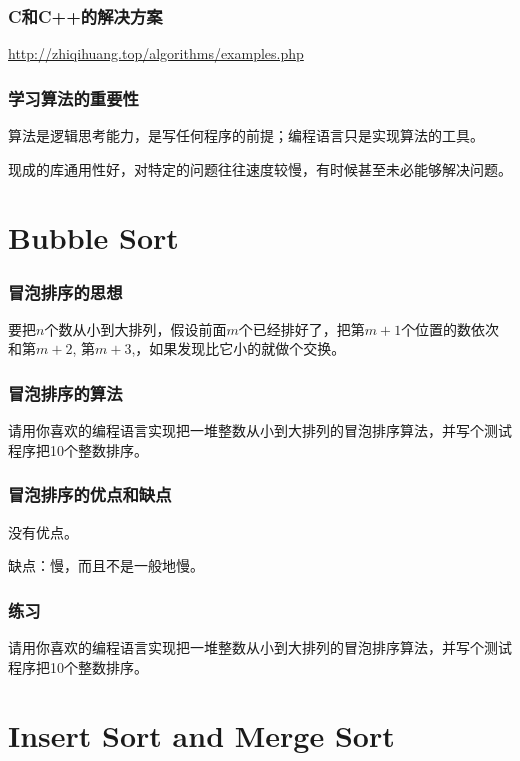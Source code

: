 \documentclass[CJK,14pt]{beamer}
\begin{document}
  \begin{frame}
\frametitle{C和C++的解决方案}


\url{http://zhiqihuang.top/algorithms/examples.php}

  \end{frame}
  
  \begin{frame}
    \frametitle{学习算法的重要性}
    \bitem
  \item{算法是逻辑思考能力，是写任何程序的前提；编程语言只是实现算法的工具。}
  \item{现成的库通用性好，对特定的问题往往速度较慢，有时候甚至未必能够解决问题。}
    \eitem
  \end{frame}
  
  
  \section{Bubble Sort}

  \begin{frame}
    \frametitle{冒泡排序的思想}
    
    要把$n$个数从小到大排列，假设前面$m$个已经排好了，把第$m+1$个位置的数依次和第$m+2$, 第$m+3$,，如果发现比它小的就做个交换。
  \end{frame}


  \begin{frame}
    \frametitle{冒泡排序的算法}
    
    请用你喜欢的编程语言实现把一堆整数从小到大排列的冒泡排序算法，并写个测试程序把10个整数排序。
  \end{frame}


    \begin{frame}
    \frametitle{冒泡排序的优点和缺点}
    \bitem
  \item{没有优点。}
  \item{缺点：慢，而且不是一般地慢。}
    \eitem
    \end{frame}


  \begin{frame}
    \frametitle{练习}
    
    请用你喜欢的编程语言实现把一堆整数从小到大排列的冒泡排序算法，并写个测试程序把10个整数排序。
  \end{frame}
    
  
  
  \section{Insert Sort and Merge Sort}
\end{document}
